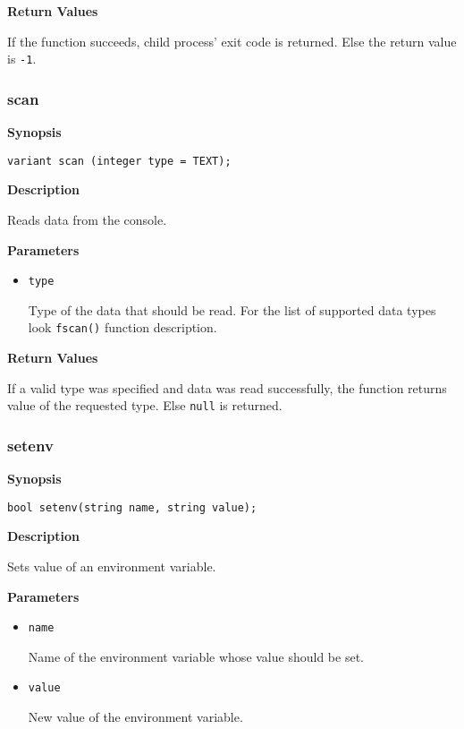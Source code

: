 \documentclass[a4paper, 10pt, titlepage]{article}
\begin{document}
\textbf{Return Values}

If the function succeeds, child process' exit code is returned. Else the return value is \texttt{-1}.

\subsubsection{scan}

\textbf{Synopsis}

\begin{verbatim}
variant scan (integer type = TEXT);
\end{verbatim}

\textbf{Description}

Reads data from the console.

\textbf{Parameters}

\begin{itemize}
\item \texttt{type}

Type of the data that should be read. For the list of supported data types look \texttt{fscan()} function description.
\end{itemize}

\textbf{Return Values}

If a valid type was specified and data was read successfully, the function returns value of the requested type. Else \texttt{null} is returned.

\subsubsection{setenv}

\textbf{Synopsis}

\begin{verbatim}
bool setenv(string name, string value);
\end{verbatim}

\textbf{Description}

Sets value of an environment variable.

\textbf{Parameters}

\begin{itemize}
\item \texttt{name}

Name of the environment variable whose value should be set.

\item \texttt{value}

New value of the environment variable.
\end{itemize}
\end{document}
